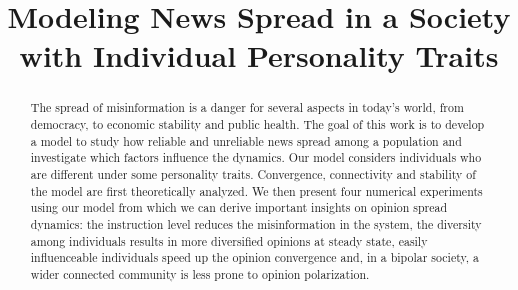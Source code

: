 \documentclass[10pt,conference]{IEEEtran}
\begin{document}
\title{Modeling News Spread in a Society with Individual Personality Traits\\}

\author{
\and
{}
\and
{}
}

\maketitle

\begin{abstract}
The spread of misinformation is a danger for several aspects in today's world, from democracy, to economic stability and public health. The goal of this work is to develop a model to study how reliable and unreliable news spread among a population and investigate which factors influence the dynamics. Our model considers individuals who are different under some personality traits. Convergence, connectivity and stability of the model are first theoretically analyzed. We then present four numerical experiments using our model from which we can derive important insights on opinion spread dynamics: the instruction level reduces the misinformation in the system, the diversity among individuals results in more diversified opinions at steady state, easily influenceable individuals speed up the opinion convergence and, in a bipolar society, a wider connected community is less prone to opinion polarization.
\end{abstract}











%
\end{document}
